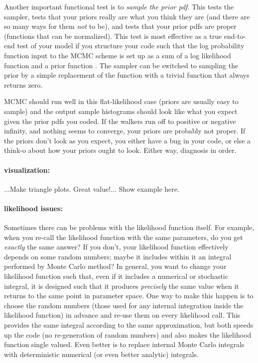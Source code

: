 \documentclass[12pt,twoside,pdftex]{article}
\begin{document}
Another important functional test is to \emph{sample the prior pdf}.
This tests the sampler,
  tests that your priors really are what you think they are
  (and there are so many ways for them \emph{not} to be),
  and tests that your prior pdfs are proper
  (functions that can be normalized).
This test is most effective as a true end-to-end test of your model
  if you structure your code such that the log probability function 
  input to the MCMC scheme
  is set up as a sum of a log likelihood function 
  and a prior function .
The sampler can be switched to sampling the prior by a simple replacement
  of the  function
  with a trivial function that always returns zero.

MCMC should run well in this flat-likelihood case (priors are usually easy to sample)
  and the output sample histograms should look like what you expect
  given the prior pdfs you coded.
If the walkers run off to positive or negative infinity,
  and nothing seems to converge,
  your priors are probably not proper.
If the priors don't look as you expect,
  you either have a bug in your code,
  or else a think-o about how your priors ought to look.
Either way, diagnosis in order.

\paragraph{visualization:}
...Make triangle plots.  Great value!...  Show example here.

\paragraph{likelihood issues:}
Sometimes there can be problems with the likelihood function itself.
For example,
  when you re-call the likelihood function with the same parameters,
  do you get \emph{exactly} the same answer?
If you don't, your likelihood function effectively depends on some random numbers;
  maybe it includes within it an integral performed by Monte Carlo method?
In general, you want to change your likelihood function such that,
  even if it includes a numerical or stochastic integral,
  it is designed such that it produces \emph{precisely} the same
  value when it returns to the same point in parameter space.
One way to make this happen is to choose the random numbers
  (those used for any internal integration inside the likelihood function)
  in advance and re-use them on every likelihood call.
This provides the same integral according to the same approximation,
  but both speeds up the code (no re-generation of random numbers)
  and also makes the likelihood function single valued.
Even better is to replace internal Monte Carlo integrals with
  deterministic numerical (or even better analytic) integrals.
\end{document}
